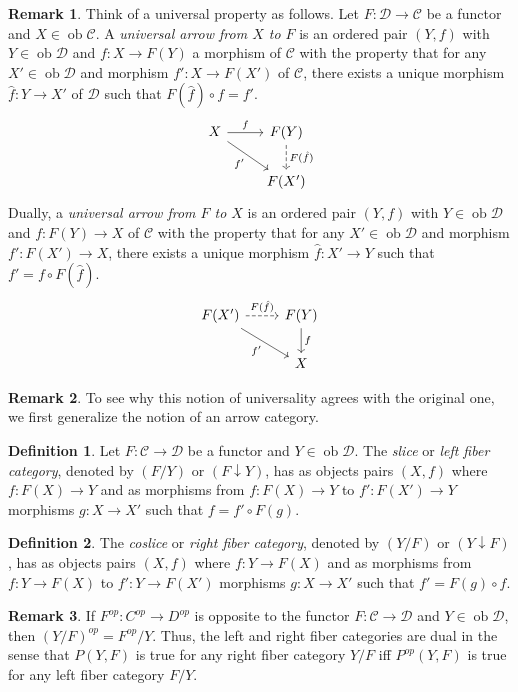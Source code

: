 \documentclass[10pt,letterpaper,cm]{nupset}
\theoremstyle{definition}
\newtheorem*{definition}{Definition}
\newtheorem{remark}{Remark}
\newcommand{\1}{\mathbf{1}}
\renewcommand{\c}{\mathscr{C}}
\renewcommand{\d}{\mathscr{D}}
\newcommand{\0}{\vec 0}
\DeclareMathOperator{\ob}{ob}
\begin{document}
\begin{remark}
Think of a universal property as follows.  Let $F : \d \to \c$ be a functor and $X \in \ob \c$. A \textit{universal arrow from $X$ to $F$} is an ordered pair $(Y, f)$ with $Y \in \ob \d$ and $f : X \to F(Y)$ a morphism of $\c$ with the property that for any $X' \in \ob \d$ and morphism $f' : X \to F(X')$ of $\c$, there exists a unique morphism $\hat{f} : Y \to X'$ of $\d$ such that $F(\hat{f}) \circ f = f'$.
\[ \begin{tikzcd}
X \arrow[r, "f"] \arrow[swap, dr,  " f' "] & F(Y) \arrow[d, dashed, "F(\hat{f})"] \\%
 & F(X')
\end{tikzcd}
\]
Dually, a \textit{universal arrow from $F$ to $X$} is an ordered pair $(Y, f)$ with $Y \in \ob \d$ and $f: F(Y) \to X$ of $\c$ with the property that for any $X' \in \ob \d$ and morphism $f' : F(X') \to X$, there exists a unique morphism $\hat{f}: X' \to Y$ such that $f' = f \circ F(\hat{f})$.
\[ \begin{tikzcd}
F(X') \arrow[r, dashed, "F(\hat{f})"] \arrow[swap, dr,  " f' "] & F(Y) \arrow[d, "f"] \\%
 & X
\end{tikzcd}
\]
\end{remark}

\begin{remark}
To see why this notion of universality agrees with the original one, we first generalize the notion of an arrow category.
\end{remark}

\begin{definition}
Let $F: \c \to \d$ be a functor and $Y \in \ob \d$. The \textit{slice} or \textit{left fiber category}, denoted by $(F/Y)$ or $(F \downarrow Y)$, has as objects pairs $(X, f)$ where $f: F(X) \to Y$ and as morphisms from $f : F(X) \to Y$ to $f' : F(X') \to Y$ morphisms $g : X \to X'$ such that $f = f' \circ F(g).$ 
\end{definition}

\begin{definition}
The \textit{coslice} or \textit{right fiber category}, denoted by $(Y/F)$ or $(Y \downarrow F)$, has as objects pairs $(X, f)$ where $f: Y\to F(X)$ and as morphisms from $f :  Y \to F(X)$ to $f' : Y \to F(X')$ morphisms $g : X \to X'$ such that $f' = F(g) \circ f.$

\end{definition}

\begin{remark}
If $F^{op}:C^{op} \to D^{op}$ is opposite to the functor $F: \c \to \d$ and $Y \in \ob \d$, then $(Y/F)^{op} = {F^{op}}/{Y}$. Thus, the left and right fiber categories are dual in the sense that $P(Y, F)$ is true for any right fiber category ${Y}/{F}$ iff $P^{op}(Y, F)$ is true for any left fiber category ${F}/{Y}$. 
\end{remark}
\end{document}
